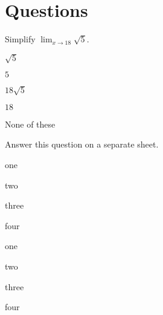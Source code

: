 \documentclass{scrartcl}
\newcommand*\choice{\item}
\begin{document}
\section{Questions}
Simplify $\lim_{x\to 18}\sqrt{5}$.
\begin{multiplechoice}[choices=1]
  \choice $\sqrt{5}$
  \choice ${5}$
  \choice $18\sqrt{5}$
  \choice $18$
  \choice None of these
\end{multiplechoice}

\begin{exercise}
  Answer this question on a separate sheet.
\end{exercise}

\begin{multiplechoice}[multiple]
  \choice one
  \choice two
  \choice three
  \choice four
\end{multiplechoice}

\begin{multiplechoice}[choices=2]
  \choice one
  \choice two
  \choice three
  \choice four
\end{multiplechoice}
\end{document}
